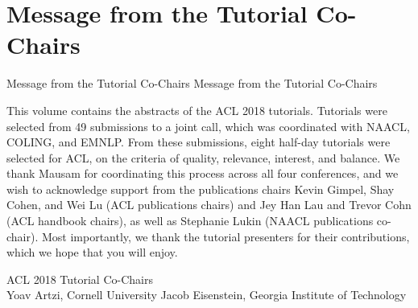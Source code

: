 \section{Message from the Tutorial Co-Chairs}\vspace{2em}
\setheaders%
    {Message from the Tutorial Co-Chairs}%
    {Message from the Tutorial Co-Chairs}
\thispagestyle{emptyheader}

\setlength{\parskip}{.7ex}

This volume contains the abstracts of the ACL 2018 tutorials. Tutorials 
were selected from 49 submissions to a joint call, which was coordinated 
with NAACL, COLING, and EMNLP. From these submissions, eight half-day 
tutorials were selected for ACL, on the criteria of quality, relevance, 
interest, and balance. We thank Mausam for coordinating this process 
across all four conferences, and we wish to acknowledge support from the 
publications chairs Kevin Gimpel, Shay Cohen, and Wei Lu (ACL 
publications chairs) and Jey Han Lau and Trevor Cohn (ACL handbook 
chairs), as well as Stephanie Lukin (NAACL publications co-chair). Most 
importantly, we thank the tutorial presenters for their contributions, 
which we hope that you will enjoy.



\vspace{1.0em}
\noindent ACL 2018 Tutorial Co-Chairs \\
Yoav Artzi, Cornell University
Jacob Eisenstein, Georgia Institute of Technology
